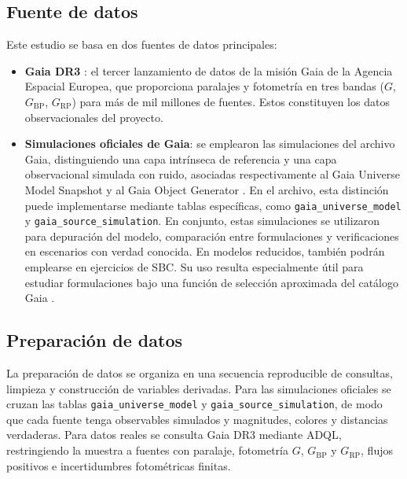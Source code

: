 \documentclass[stu, 12pt, letterpaper, donotrepeattitle, floatsintext, natbib]{apa7_ula}
\begin{document}
\subsection{Fuente de datos}

Este estudio se basa en dos fuentes de datos principales:

\begin{itemize}
    \item \textbf{Gaia DR3} \citep{Vallenari2022GaiaDR}: el tercer
    lanzamiento de datos de la misión Gaia de la Agencia Espacial
    Europea, que proporciona paralajes y fotometría en tres bandas
    ($G$, $G_{\text{BP}}$, $G_{\text{RP}}$) para más de mil millones
    de fuentes. Estos constituyen los datos observacionales del
    proyecto.
    \item \textbf{Simulaciones oficiales de Gaia}: se emplearon las
    simulaciones del archivo Gaia, distinguiendo una capa intrínseca
    de referencia y una capa observacional simulada con ruido,
    asociadas respectivamente al Gaia Universe Model Snapshot
    \citep{Robin_2012} y al Gaia Object Generator \citep{Luri_2014}.
    En el archivo, esta distinción puede implementarse mediante tablas
    específicas, como \texttt{gaia\_universe\_model} y
    \texttt{gaia\_source\_simulation}. En conjunto, estas
    simulaciones se utilizaron para depuración del modelo,
    comparación entre formulaciones y verificaciones en escenarios con
    verdad conocida. En modelos reducidos, también podrán emplearse en
    ejercicios de SBC. Su uso resulta especialmente útil para estudiar
    formulaciones bajo una función de selección aproximada del
    catálogo Gaia \citep{Everall_Boubert_2021,CastroGinard_2023}.
\end{itemize}

\subsection{Preparación de datos}

La preparación de datos se organiza en una secuencia reproducible de
consultas, limpieza y construcción de variables derivadas. Para las
simulaciones oficiales se cruzan las tablas
\texttt{gaia\_universe\_model} y \texttt{gaia\_source\_simulation}, de
modo que cada fuente tenga observables simulados y magnitudes,
colores y distancias verdaderas. Para datos reales se consulta Gaia
DR3 mediante ADQL, restringiendo la muestra a fuentes con paralaje,
fotometría $G$, $G_{\mathrm{BP}}$ y $G_{\mathrm{RP}}$, flujos positivos
e incertidumbres fotométricas finitas.
\end{document}
